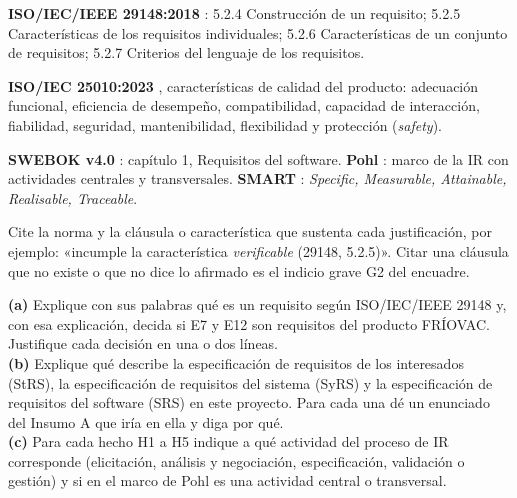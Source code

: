 \documentclass[11pt]{article}
\begin{document}
\begin{cajaclave}[title={Referencias que puede citar (sin consultar los documentos)}]

	\textbf{ISO/IEC/IEEE 29148:2018} \citep{iso29148_2018}: 5.2.4 Construcción de un requisito; 5.2.5 Características de los requisitos individuales; 5.2.6 Características de un conjunto de requisitos; 5.2.7 Criterios del lenguaje de los requisitos.\par

	\textbf{ISO/IEC 25010:2023} \citep{iso25010_2023}, características de calidad del producto: adecuación funcional, eficiencia de desempeño, compatibilidad, capacidad de interacción, fiabilidad, seguridad, mantenibilidad, flexibilidad y protección (\emph{safety}).\par

	\textbf{SWEBOK v4.0} \citep{swebok_v4_2024}: capítulo 1, Requisitos del software. \textbf{Pohl} \citep{pohl_2025}: marco de la IR con actividades centrales y transversales. \textbf{SMART} \citep{mannion_smart_1995}: \emph{Specific, Measurable, Attainable, Realisable, Traceable}.\par

	Cite la norma y la cláusula o característica que sustenta cada justificación, por ejemplo: «incumple la característica \emph{verificable} (29148, 5.2.5)». Citar una cláusula que no existe o que no dice lo afirmado es el indicio grave G2 del encuadre.

\end{cajaclave}



\begin{cajatarea}[title={T1. Conceptos aplicados al caso \hfill D1 · 10\,\%}]

	\textbf{(a)} Explique con sus palabras qué es un requisito según ISO/IEC/IEEE 29148 y, con esa explicación, decida si E7 y E12 son requisitos del producto FRÍOVAC. Justifique cada decisión en una o dos líneas.\\[4pt]

	\textbf{(b)} Explique qué describe la especificación de requisitos de los interesados (StRS), la especificación de requisitos del sistema (SyRS) y la especificación de requisitos del software (SRS) en este proyecto. Para cada una dé un enunciado del Insumo A que iría en ella y diga por qué.\\[4pt]

	\textbf{(c)} Para cada hecho H1 a H5 indique a qué actividad del proceso de IR corresponde (elicitación, análisis y negociación, especificación, validación o gestión) y si en el marco de Pohl es una actividad central o transversal.

\end{cajatarea}
\end{document}
